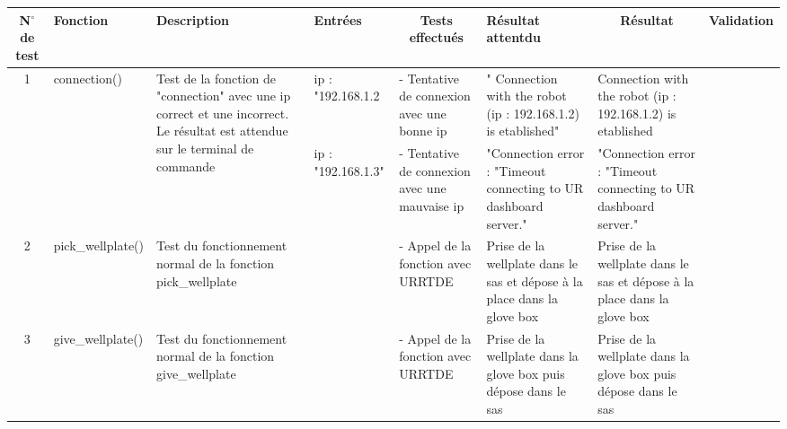 \documentclass[
    iai, %
    eai, %
]{heig-tb}
\begin{document}
\begin{sidewaystable}[ht]
    \begin{tabular}{@{}c|p{3cm}|p{3cm}|p{3cm}|p{3cm}|p{3cm}|p{3cm}|c@{}}
    \toprule
    N$^\circ$ de test          & Fonction                            & Description                                                                                                                                                                                & Entrées            & \multicolumn{1}{c}{Tests effectués}           & Résultat attentdu                                                                                & \multicolumn{1}{c}{Résultat}                                                                     & Validation                \\ \midrule
    \multirow{2}{*}{1}  & \multirow{2}{*}{connection()}       &  \multirow{2}{*}{Test de la fonction de "connection" avec une ip correct et une incorrect. Le résultat est attendue sur le terminal de commande}                                           & ip : "192.168.1.2  & - Tentative de connexion avec une bonne ip    & " Connection with the robot (ip : 192.168.1.2) is etablished"                                    & Connection with the robot (ip : 192.168.1.2) is etablished                                       & \cellcolor[HTML]{B2FFB2} \\
                        &                                     &                                                                                                                                                                                            & ip : "192.168.1.3" & - Tentative de connexion avec une mauvaise ip & "Connection error : "Timeout connecting to UR dashboard server."                                 & "Connection error : "Timeout connecting to UR dashboard server."                                 & \cellcolor[HTML]{B2FFB2} \\
    2                   & pick\_wellplate()                   & Test du fonctionnement normal de la fonction pick\_wellplate                                                                                                                               &                    & - Appel de la fonction avec URRTDE            & Prise de la wellplate dans le sas et dépose à la place dans la glove box                         & Prise de la wellplate dans le sas et dépose à la place dans la glove box                         & \cellcolor[HTML]{B2FFB2} \\
    3                   & give\_wellplate()                   & Test du fonctionnement normal de la fonction give\_wellplate                                                                                                                               &                    & - Appel de la fonction avec URRTDE            & Prise de la wellplate dans la glove box puis dépose dans le sas                                  & Prise de la wellplate dans la glove box puis dépose dans le sas                                  & \cellcolor[HTML]{B2FFB2} \\

\end{tabular}
\end{sidewaystable}
\end{document}

